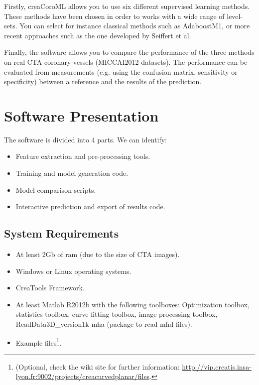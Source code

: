 Firstly, creaCoroML allows you to use six different supervised learning methods. These methods have been chosen in order to works with a wide range of level-sets. You can select for instance classical methods such as AdaboostM1, or more recent approaches such as the one developed by Seiffert et al.
 
Finally, the software allows you to compare the performance of the three methods on real CTA coronary vessels (MICCAI2012 datasets). The performance can be evaluated from measurements (e.g. using the confusion matrix, sensitivity or specificity) between a reference and the results of the prediction.

\section{Software Presentation}

The software is divided into 4 parts. We can identify:
\begin{itemize}
\item Feature extraction and pre-processing tools.
\item Training and model generation code.
\item Model comparison scripts.
\item Interactive prediction and export of results code.
\end{itemize}

\subsection{System Requirements}

\begin{itemize}
\item At least 2Gb of ram (due to the size of CTA images).
\item Windows or Linux operating systems.
\item CreaTools Framework.
\item At least Matlab R2012b with the following toolboxes: Optimization toolbox, statistics toolbox, curve fitting toolbox, image processing toolbox, ReadData3D\_version1k\/ mha (package to read mhd files).
\item Example files\footnote{(Optional\*, check the wiki site for further information: \href{http://vip.creatis.insa-lyon.fr:9002/projects/creacurvedplanar/files}{http://vip.creatis.insa-lyon.fr:9002/projects/creacurvedplanar/files}.}.
\end{itemize}

